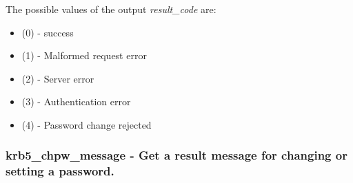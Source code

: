 \documentclass[letterpaper,10pt,english]{sphinxmanual}
\begin{document}
The possible values of the output \emph{result\_code} are:
\begin{itemize}
\item {} 
{\hyperref[appdev/refs/macros/KRB5_KPASSWD_SUCCESS:KRB5_KPASSWD_SUCCESS]{}} (0) - success

\item {} 
{\hyperref[appdev/refs/macros/KRB5_KPASSWD_MALFORMED:KRB5_KPASSWD_MALFORMED]{}} (1) - Malformed request error

\item {} 
{\hyperref[appdev/refs/macros/KRB5_KPASSWD_HARDERROR:KRB5_KPASSWD_HARDERROR]{}} (2) - Server error

\item {} 
{\hyperref[appdev/refs/macros/KRB5_KPASSWD_AUTHERROR:KRB5_KPASSWD_AUTHERROR]{}} (3) - Authentication error

\item {} 
{\hyperref[appdev/refs/macros/KRB5_KPASSWD_SOFTERROR:KRB5_KPASSWD_SOFTERROR]{}} (4) - Password change rejected

\end{itemize}


\subsubsection{krb5\_chpw\_message -  Get a result message for changing or setting a password.}
\label{appdev/refs/api/krb5_chpw_message:krb5-chpw-message-get-a-result-message-for-changing-or-setting-a-password}\label{appdev/refs/api/krb5_chpw_message::doc}

\begin{fulllineitems}
\label{appdev/refs/api/krb5_chpw_message:krb5_chpw_message}
\end{fulllineitems}
\end{document}
